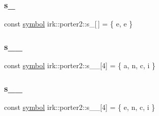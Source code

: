 \mbox{\label{namespaceirk_1_1porter2_a71ceb0d1286accd7f14ab3f64cc91bb1}} 
\subsubsection{\texorpdfstring{s\+\_}{s\_5}}
{\footnotesize\ttfamily const \mbox{\hyperlink{namespaceirk_1_1porter2_afd04c4eb58a1dabcf8f3ab2d7e9f9ed5}{symbol}} irk\+::porter2\+::s\+\_\mbox{[}$\,$\mbox{]} = \{ \textquotesingle{}e\textquotesingle{}, \textquotesingle{}e\textquotesingle{} \}\hspace{0.3cm}{\ttfamily [static]}}

\mbox{\label{namespaceirk_1_1porter2_a5e4b3d9c4a9ff623b24c2fae1856e7ee}} 
\subsubsection{\texorpdfstring{s\+\_\+\_}{s\_5\_0}}
{\footnotesize\ttfamily const \mbox{\hyperlink{namespaceirk_1_1porter2_afd04c4eb58a1dabcf8f3ab2d7e9f9ed5}{symbol}} irk\+::porter2\+::s\+\_\+\_\mbox{[}4\mbox{]} = \{ \textquotesingle{}a\textquotesingle{}, \textquotesingle{}n\textquotesingle{}, \textquotesingle{}c\textquotesingle{}, \textquotesingle{}i\textquotesingle{} \}\hspace{0.3cm}{\ttfamily [static]}}

\mbox{\label{namespaceirk_1_1porter2_a3feee14801b58a46b6ccf287f2ab1175}} 
\subsubsection{\texorpdfstring{s\+\_\+\_}{s\_5\_1}}
{\footnotesize\ttfamily const \mbox{\hyperlink{namespaceirk_1_1porter2_afd04c4eb58a1dabcf8f3ab2d7e9f9ed5}{symbol}} irk\+::porter2\+::s\+\_\+\_\mbox{[}4\mbox{]} = \{ \textquotesingle{}e\textquotesingle{}, \textquotesingle{}n\textquotesingle{}, \textquotesingle{}c\textquotesingle{}, \textquotesingle{}i\textquotesingle{} \}\hspace{0.3cm}{\ttfamily [static]}}

